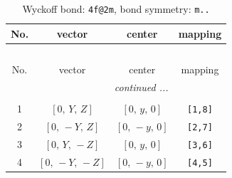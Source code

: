\documentclass[fleqn,8pt]{jsarticle}
\begin{document}
\renewcommand{\arraystretch}{1.2}
\begin{longtable}{cccc}
\caption{Wyckoff bond: {\tt 4f@2m}, bond symmetry: {\tt m..}}
 \\
 \hline \hline
No. & vector & center & mapping \\ \hline \endfirsthead

\multicolumn{3}{l}{\tablename\ \thetable{}} \\
 \hline \hline
No. & vector & center & mapping \\ \hline \endhead

 \hline \hline
\multicolumn{3}{r}{\footnotesize\it continued ...} \\ \endfoot

 \hline \hline
\multicolumn{3}{r}{} \\ \endlastfoot

1 & $\left[ 0,\, Y,\, Z \right]$ & $\left[ 0,\, y,\, 0 \right]$ & {\tt [1,8]} \\ \hline
2 & $\left[ 0,\, - Y,\, Z \right]$ & $\left[ 0,\, - y,\, 0 \right]$ & {\tt [2,7]} \\ \hline
3 & $\left[ 0,\, Y,\, - Z \right]$ & $\left[ 0,\, y,\, 0 \right]$ & {\tt [3,6]} \\ \hline
4 & $\left[ 0,\, - Y,\, - Z \right]$ & $\left[ 0,\, - y,\, 0 \right]$ & {\tt [4,5]} \\
\end{longtable}
\renewcommand{\arraystretch}{1.2}
\end{document}

